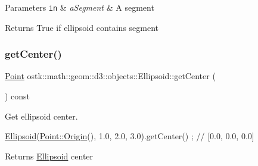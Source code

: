 \begin{DoxyParams}[1]{Parameters}
\mbox{\tt in}  & {\em a\+Segment} & A segment \\
\hline
\end{DoxyParams}
\begin{DoxyReturn}{Returns}
True if ellipsoid contains segment 
\end{DoxyReturn}
\mbox{\label{classostk_1_1math_1_1geom_1_1d3_1_1objects_1_1_ellipsoid_a0b1f86eb5b3cb20a8306a951a6006d4e}} 
\subsubsection{\texorpdfstring{get\+Center()}{getCenter()}}
{\footnotesize\ttfamily \hyperlink{classostk_1_1math_1_1geom_1_1d3_1_1objects_1_1_point}{Point} ostk\+::math\+::geom\+::d3\+::objects\+::\+Ellipsoid\+::get\+Center (\begin{DoxyParamCaption}{ }\end{DoxyParamCaption}) const}



Get ellipsoid center. 


\begin{DoxyCode}
\hyperlink{classostk_1_1math_1_1geom_1_1d3_1_1objects_1_1_ellipsoid_a106c71abf9503f3d06b2613c1c7e9d65}{Ellipsoid}(\hyperlink{classostk_1_1math_1_1geom_1_1d3_1_1objects_1_1_point_a079c199f08b015d456d02728a71b534c}{Point::Origin}(), 1.0, 2.0, 3.0).getCenter() ; \textcolor{comment}{// [0.0, 0.0, 0.0]}
\end{DoxyCode}


\begin{DoxyReturn}{Returns}
\hyperlink{classostk_1_1math_1_1geom_1_1d3_1_1objects_1_1_ellipsoid}{Ellipsoid} center 
\end{DoxyReturn}
\mbox{\label{classostk_1_1math_1_1geom_1_1d3_1_1objects_1_1_ellipsoid_a29d6b71247c279c5940c1ede221a5aac}} 

